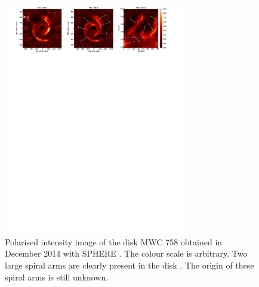 \begin{figure}
    \centering
    \includegraphics[width = 0.7\textwidth]{figures/mwc758.pdf}
    \caption{Polarised intensity image of the disk MWC 758 obtained in December 2014 with SPHERE \citep[eg.][]{beuzit2019}. The colour scale is arbitrary. Two large spiral arms are clearly present in the disk \citep{benisty2015}. The origin of these spiral arms is still unknown.}
    \label{fig:mwc758}
\end{figure}

